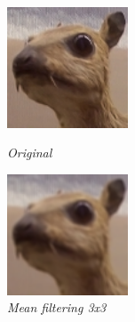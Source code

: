 \documentclass[paper=a4, fontsize=10pt]{scrartcl}	%
\begin{document}
	\begin{figure}[H]
		\centering
		\begin{minipage}[b]{0.45\textwidth}
			\centering
			\includegraphics[width=0.32\textwidth]{images/heatmap/scoiattolo1.png}
			\caption{\textit{Original}}
		\end{minipage}
		\hfill
		\begin{minipage}[b]{0.45\textwidth}
			\centering
			\includegraphics[width=0.32\textwidth]{images/heatmap/scoiattolo1_blur.png}
			\caption{\textit{Mean filtering 3x3}}
		\end{minipage}
	\end{figure}
\end{document}
